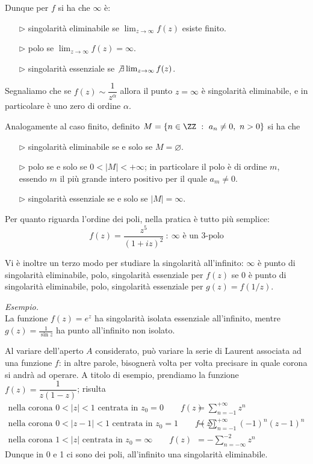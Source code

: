 Dunque per $f$ si ha che $\infty$ è:
\begin{enumerate}
    \item [$\triangleright$] singolarità eliminabile se $\lim_{z\to \infty}f(z)$ esiste finito.
    \item [$\triangleright$] polo se $\lim_{z\to \infty}f(z)=\infty$.
    \item [$\triangleright$] singolarità essenziale se $\not\exists\lim_{z\to \infty}f(z)$.
\end{enumerate}

Segnaliamo che se $f(z)\sim\dfrac{1}{z^{\alpha}}$ allora il punto $z=\infty$ è singolarità eliminabile, e in particolare è uno zero di ordine $\alpha$.

Analogamente al caso finito, definito $M=\left\{n\in\ZZ\ :\ a_n\neq 0,\ n>0 \right\}$ si ha che
\begin{enumerate}
    \item [$\triangleright$] singolarità eliminabile se e solo se $M=\varnothing$.
    \item [$\triangleright$] polo se e solo se $0<|M|<+\infty$; in particolare il polo è di ordine $m$, essendo $m$ il più grande intero positivo per il quale $a_{m}\neq 0$.
    \item [$\triangleright$] singolarità essenziale se e solo se $|M|=\infty$.
\end{enumerate}

Per quanto riguarda l'ordine dei poli, nella pratica è tutto più semplice: 
\begin{equation*}
f(z)=\frac{z^5}{(1+iz)^2}\ :\ \infty\text{ è un 3-polo}
\end{equation*}

Vi è inoltre un terzo modo per studiare la singolarità all'infinito: $\infty$ è punto di singolarità eliminabile, polo, singolarità essenziale per $f(z)$ se 0 è punto di singolarità eliminabile, polo, singolarità essenziale per $g(z)=f(1/z)$.

\textit{Esempio.}\\
La funzione $f(z) = e^{z}$ ha singolarità isolata essenziale all'infinito, mentre $g(z) = \frac{1}{\sin z}$ ha punto all'infinito non isolato.

\begin{rem}
Al variare dell'aperto $A$ considerato, può variare la serie di Laurent associata ad una funzione $f$: in altre parole, bisognerà volta per volta precisare in quale corona si andrà ad operare. A titolo di esempio, prendiamo la funzione $f(z)=\dfrac{1}{z(1-z)}$; risulta
\begin{align*}
\text{nella corona }0<|z|<1\text{ centrata in }z_0=0 \qquad f(z)&=\sum_{n=-1}^{+\infty} z^n \\
\text{nella corona }0<|z-1|<1\text{ centrata in }z_0=1 \qquad f(z)&=\sum_{n=-1}^{+\infty}(-1)^n(z-1)^n \\
\text{nella corona }1<|z|\text{ centrata in }z_0=\infty \qquad f(z)&=-\sum_{n=-\infty}^{-2}z^n
\end{align*}
Dunque in 0 e 1 ci sono dei poli, all'infinito una singolarità eliminabile.
\end{rem}

